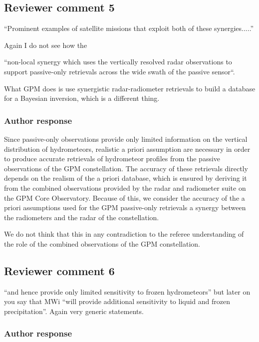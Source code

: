 \begin{description}
\subsection*{Reviewer comment 5}

``Prominent examples of satellite missions that exploit both of these
synergies.....''

Again I do not
see how the

``non-local synergy which uses the vertically resolved radar
observations to support passive-only retrievals across the wide swath of the
passive sensor``.

What GPM does is use synergistic radar-radiometer retrievals
to build a database for a Bayesian inversion, which is a different thing.

\subsubsection*{Author response}

Since passive-only observations provide only limited information on the vertical
distribution of hydrometeors, realistic a priori assumption are necessary in
order to produce accurate retrievals of hydrometeor profiles from the passive
observations of the GPM constellation. The accuracy of these retrievals directly
depends on the realism of the a priori database, which is ensured by deriving it
from the combined observations provided by the radar and radiometer suite on the
GPM Core Observatory. Because of this, we consider the accuracy of the a priori
assumptions used for the GPM passive-only retrievals a synergy between the
radiometers and the radar of the constellation.

We do not think that this in any contradiction to the referee understanding of
the role of the combined observations of the GPM constellation.

\subsection*{Reviewer comment 6}
``and hence provide only limited sensitivity to frozen hydrometeors'' but later
on you say that MWi ``will provide additional sensitivity to liquid and frozen
precipitation''. Again very generic statements.

\subsubsection*{Author response}


\end{description}
